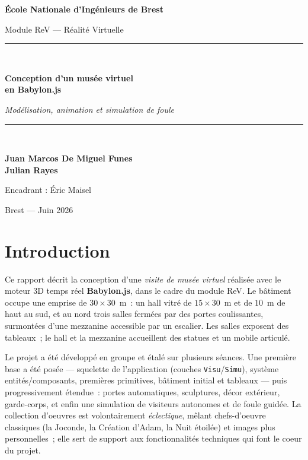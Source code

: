 \documentclass[11pt,a4paper]{article}
\begin{document}
\begin{titlepage}
\centering
\vspace*{1.5cm}
{\Large\bfseries École Nationale d'Ingénieurs de Brest\par}
\vspace{0.3cm}
{\large Module ReV --- Réalité Virtuelle\par}
\vspace{2.5cm}
\rule{\linewidth}{0.5pt}\\[0.5cm]
{\huge\bfseries Conception d'un musée virtuel\\[0.3cm] en Babylon.js\par}
\vspace{0.4cm}
{\large\itshape Modélisation, animation et simulation de foule\par}
\rule{\linewidth}{0.5pt}\\[2.5cm]

{\large
\textbf{Juan Marcos De Miguel Funes}\\[0.2cm]
\textbf{Julian Rayes}\par}
\vspace{2.5cm}
{\large Encadrant : Éric Maisel\par}
\vfill
{\large Brest --- Juin 2026\par}
\end{titlepage}

\clearpage
\tableofcontents
\clearpage

\section{Introduction}

Ce rapport décrit la conception d'une \emph{visite de musée virtuel} réalisée
avec le moteur 3D temps réel \textbf{Babylon.js}, dans le cadre du module ReV.
Le bâtiment occupe une emprise de $30\times30$~m~: un hall vitré de $15\times30$~m
et de $10$~m de haut au sud, et au nord trois salles fermées par des portes
coulissantes, surmontées d'une mezzanine accessible par un escalier. Les salles
exposent des tableaux~; le hall et la mezzanine accueillent des statues et un
mobile articulé.

Le projet a été développé en groupe et étalé sur plusieurs séances. Une première
base a été posée --- squelette de l'application (couches \texttt{Visu}/\texttt{Simu}),
système entités/composants, premières primitives, bâtiment initial et tableaux ---
puis progressivement étendue~: portes automatiques, sculptures, décor extérieur,
garde-corps, et enfin une simulation de visiteurs autonomes et de foule guidée. La
collection d'oeuvres est volontairement \emph{éclectique}, mêlant chefs-d'oeuvre
classiques (la Joconde, la Création d'Adam, la Nuit étoilée) et images plus
personnelles~; elle sert de support aux fonctionnalités techniques qui font le
coeur du projet.
\end{document}
